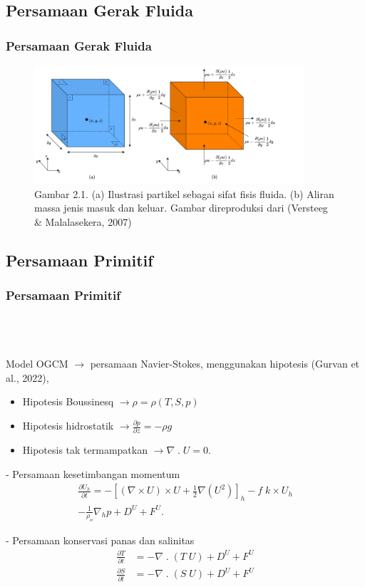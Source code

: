 \documentclass{beamer}
\begin{document}
\subsection{Persamaan Gerak Fluida}
\begin{frame}
	\frametitle{Persamaan Gerak Fluida}
	\begin{figure}[H]
		\centering
		\includegraphics[width=10cm]{cube.png}
		\captionsetup{labelformat=empty}
		\caption{Gambar 2.1. (a) Ilustrasi partikel sebagai sifat fisis fluida. (b) Aliran massa jenis masuk dan keluar. Gambar direproduksi dari (Versteeg \& Malalasekera, 2007)}
		\label{fig:cube}
	\end{figure}
\end{frame}

\subsection{Persamaan Primitif}
\begin{frame}[allowframebreaks]
	\frametitle{Persamaan Primitif}
	$\;$ \\
	$\;$ \\
	$\;$ \\
	Model OGCM $\rightarrow$ persamaan Navier-Stokes, menggunakan hipotesis (Gurvan et al., 2022),
	\begin{itemize}
		\item {\small Hipotesis Boussinesq $\rightarrow \rho = \rho(T,S,p)$}
		\item {\small Hipotesis hidrostatik $\rightarrow \frac{\partial p}{\partial z} = -\rho g$}
		\item {\small Hipotesis tak termampatkan $\rightarrow \nabla \;.\; U = 0$}.
	\end{itemize}
	\newpage
		- Persamaan kesetimbangan momentum
	\begin{equation}
		\begin{aligned}
			\frac{\partial U_h}{\partial t} = - \left[(\nabla \times U) \times U + \frac{1}{2}\nabla (U^2)\right]_h - f \; k \times U_h \\
			- \frac{1}{\rho_o}\nabla_h p + D^U + F^U.
		\end{aligned}
	\end{equation}

	- Persamaan konservasi panas dan salinitas
	\begin{equation}
		\begin{aligned}
			\frac{\partial T}{\partial t} &= - \nabla \; . \; (T\;U)  + D^U + F^U \\
			\frac{\partial S}{\partial t} &= - \nabla \; . \; (S\;U)  + D^U + F^U
		\end{aligned}
	\end{equation}
\end{frame}
\end{document}

